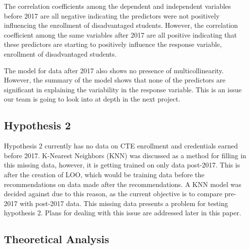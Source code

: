 

The correlation coefficients among the dependent and independent variables before 2017 are all negative indicating the predictors were not positively influencing the enrollment of disadvantaged students. 
However, the correlation coefficient among the same variables after 2017 are all positive indicating that these predictors are starting to positively influence the response variable, enrollment of disadvantaged students.

The model for data after 2017 also shows no presence of multicollinearity. 
However, the summary of the model shows that none of the predictors are  significant in explaining the variability in the response variable. 
This is an issue our team is going to look into at depth in the next project. 

\subsection{Hypothesis 2}

Hypothesis 2 currently has no data on CTE enrollment and credentials earned before 2017. K-Nearest Neighbors (KNN) was discussed as a method for filling in this missing data, however, it is getting trained on only data post-2017. 
This is after the creation of LOO, which would be training data before the recommendations on data made after the recommendations. A KNN model was decided against due to this reason, as the current objective is to compare pre-2017 with post-2017 data. 
This missing data presents a problem for testing hypothesis 2. Plans for dealing with this issue are addressed later in this paper. 


\subsection{Theoretical Analysis}







